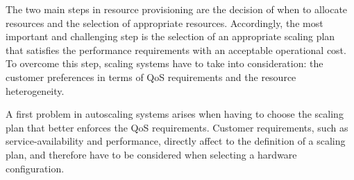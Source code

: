 \label{sec:motivation}

The two main steps in resource provisioning are the decision of when to allocate resources and the selection of appropriate resources.
Accordingly, the most important and challenging step is the selection of an appropriate scaling plan that satisfies the performance requirements with an acceptable operational cost. 
To overcome this step, scaling systems have to take into consideration: the customer preferences in terms of QoS requirements and the resource heterogeneity.

A first problem in autoscaling systems arises when having to choose the scaling plan that better enforces the QoS requirements. Customer requirements, such as service-availability and performance, directly affect to the definition of a scaling plan, and therefore have to be considered when selecting a hardware configuration.



